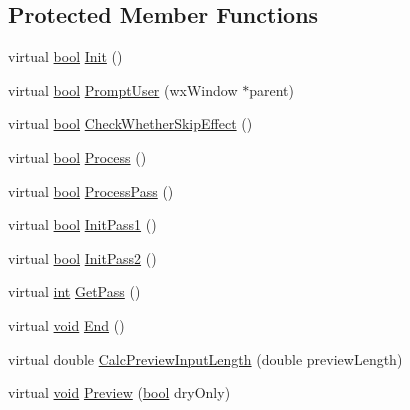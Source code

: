 \subsection*{Protected Member Functions}
\begin{DoxyCompactItemize}
\item 
virtual \hyperlink{mac_2config_2i386_2lib-src_2libsoxr_2soxr-config_8h_abb452686968e48b67397da5f97445f5b}{bool} \hyperlink{class_effect_a0af76827a8101633edf2f23a9d7db96d}{Init} ()
\item 
virtual \hyperlink{mac_2config_2i386_2lib-src_2libsoxr_2soxr-config_8h_abb452686968e48b67397da5f97445f5b}{bool} \hyperlink{class_effect_a403f54cd78e36b312f994def6d390465}{Prompt\+User} (wx\+Window $\ast$parent)
\item 
virtual \hyperlink{mac_2config_2i386_2lib-src_2libsoxr_2soxr-config_8h_abb452686968e48b67397da5f97445f5b}{bool} \hyperlink{class_effect_a7678a9ca3de65282f481ed1bd713140e}{Check\+Whether\+Skip\+Effect} ()
\item 
virtual \hyperlink{mac_2config_2i386_2lib-src_2libsoxr_2soxr-config_8h_abb452686968e48b67397da5f97445f5b}{bool} \hyperlink{class_effect_a005d1433b7d816b0765a0a72a086061c}{Process} ()
\item 
virtual \hyperlink{mac_2config_2i386_2lib-src_2libsoxr_2soxr-config_8h_abb452686968e48b67397da5f97445f5b}{bool} \hyperlink{class_effect_a9578df21ddcf41552587b75d0e2935b1}{Process\+Pass} ()
\item 
virtual \hyperlink{mac_2config_2i386_2lib-src_2libsoxr_2soxr-config_8h_abb452686968e48b67397da5f97445f5b}{bool} \hyperlink{class_effect_abf97e54976d3b64f2dfd3f091dbf94cf}{Init\+Pass1} ()
\item 
virtual \hyperlink{mac_2config_2i386_2lib-src_2libsoxr_2soxr-config_8h_abb452686968e48b67397da5f97445f5b}{bool} \hyperlink{class_effect_aadd933d39d89b188c5756bf7f90cef5e}{Init\+Pass2} ()
\item 
virtual \hyperlink{xmltok_8h_a5a0d4a5641ce434f1d23533f2b2e6653}{int} \hyperlink{class_effect_a594a7de86e4a84a868ecedef105429ac}{Get\+Pass} ()
\item 
virtual \hyperlink{sound_8c_ae35f5844602719cf66324f4de2a658b3}{void} \hyperlink{class_effect_a1d0714e69fa85b38334da1b6987a5f74}{End} ()
\item 
virtual double \hyperlink{class_effect_abcf6f7f032d61a7dbd3b7965eed18dc7}{Calc\+Preview\+Input\+Length} (double preview\+Length)
\item 
virtual \hyperlink{sound_8c_ae35f5844602719cf66324f4de2a658b3}{void} \hyperlink{class_effect_a1cbc267f552dd9250b12a6b806ddc099}{Preview} (\hyperlink{mac_2config_2i386_2lib-src_2libsoxr_2soxr-config_8h_abb452686968e48b67397da5f97445f5b}{bool} dry\+Only)

\end{DoxyCompactItemize}
